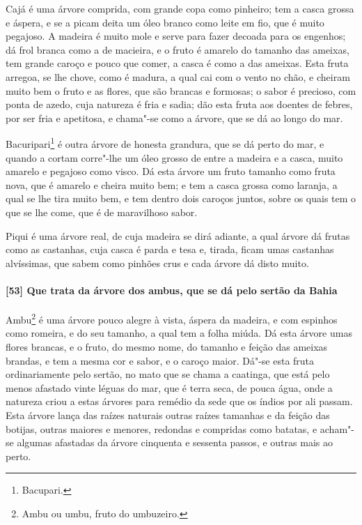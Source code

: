 \begin{linenumbers}
Cajá é uma árvore comprida, com grande copa como pinheiro; tem a casca grossa e áspera, e
se a picam deita um óleo branco como leite em fio, que é muito pegajoso. A madeira é muito
mole e serve para fazer decoada para os engenhos; dá frol branca como a de macieira, e o
fruto é amarelo do tamanho das ameixas, tem grande caroço e pouco que comer, a casca é
como a das ameixas. Esta fruta arregoa, se lhe chove, como é madura, a qual cai com o
vento no chão, e cheiram muito bem o fruto e as flores, que são brancas e formosas; o
sabor é precioso, com ponta de azedo, cuja natureza é fria e sadia; dão esta fruta aos
doentes de febres, por ser fria e apetitosa, e chama"-se como a árvore, que se dá ao longo
do mar.

Bacuripari\footnote{ Bacupari.} é outra árvore de honesta grandura, que se dá perto do
mar, e quando a cortam corre"-lhe um óleo grosso de entre a madeira e a casca, muito
amarelo e pegajoso como visco. Dá esta árvore um fruto tamanho como fruta nova, que é
amarelo e cheira muito bem; e tem a casca grossa como laranja, a qual se lhe tira muito
bem, e tem dentro dois caroços juntos, sobre os quais tem o que se lhe come, que é de
maravilhoso sabor.

Piqui é uma árvore real, de cuja madeira se dirá adiante, a qual árvore dá frutas como as
castanhas, cuja casca é parda e tesa e, tirada, ficam umas castanhas alvíssimas, que sabem
como pinhões crus e cada árvore dá disto muito.

\paragraph{[53] Que trata da árvore dos ambus, que se dá pelo sertão da Bahia}\quad
Ambu\footnote{ Ambu ou umbu, fruto do umbuzeiro.} é uma árvore pouco alegre à vista,
áspera da madeira, e com espinhos como romeira, e do seu tamanho, a qual tem a folha
miúda. Dá esta árvore umas flores brancas, e o fruto, do mesmo nome, do tamanho e feição
das ameixas brandas, e tem a mesma cor e sabor, e o caroço maior. Dá"-se esta fruta
ordinariamente pelo sertão, no mato que se chama a caatinga, que está pelo menos afastado
vinte léguas do mar, que é terra seca, de pouca água, onde a natureza criou a estas
árvores para remédio da sede que os índios por ali passam. Esta árvore lança das raízes
naturais outras raízes tamanhas e da feição das botijas, outras maiores e menores,
redondas e compridas como batatas, e acham"-se algumas afastadas da árvore cinquenta e
sessenta passos, e outras mais ao perto.


\end{linenumbers}
